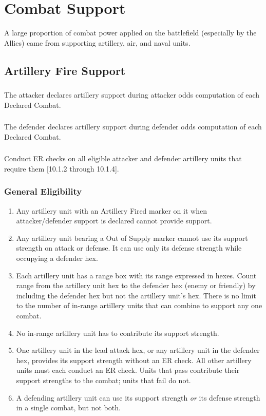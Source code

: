 \section{Combat Support}
A large proportion of combat power applied on the battlefield (especially by the Allies) came from supporting artillery, air, and naval units.

\subsection{Artillery Fire Support}

\subsubsection{}
The attacker declares artillery support during attacker odds computation of each Declared Combat.

\subsubsection{}
The defender declares artillery support during defender odds computation of each Declared Combat.

\subsubsection{}
Conduct ER checks on all eligible attacker and defender artillery units that require them [10.1.2 through 10.1.4].

\subsubsection{\textbf{General Eligibility}}

\begin{enumerate}[label=\alph*.]
    \item Any artillery unit with an Artillery Fired marker on it when attacker/defender support is declared cannot provide support.
    \item Any artillery unit bearing a Out of Supply marker cannot use its support strength on attack or defense. It can use only its defense strength while occupying a defender hex.
    \item Each artillery unit has a range box with its range expressed in hexes. Count range from the artillery unit hex to the defender hex (enemy or friendly) by including the defender hex but not the artillery unit's hex. There is no limit to the number of in-range artillery units that can combine to support any one combat.
    \item No in-range artillery unit has to contribute its support strength.
    \item One artillery unit in the lead attack hex, or any artillery unit in the defender hex, provides its support strength without an ER check. All other artillery units must each conduct an ER check. Units that pass contribute their support strengths to the combat; units that fail do not.
    \item A defending artillery unit can use its support strength \textit{or} its defense strength in a single combat, but not both.
\end{enumerate}

